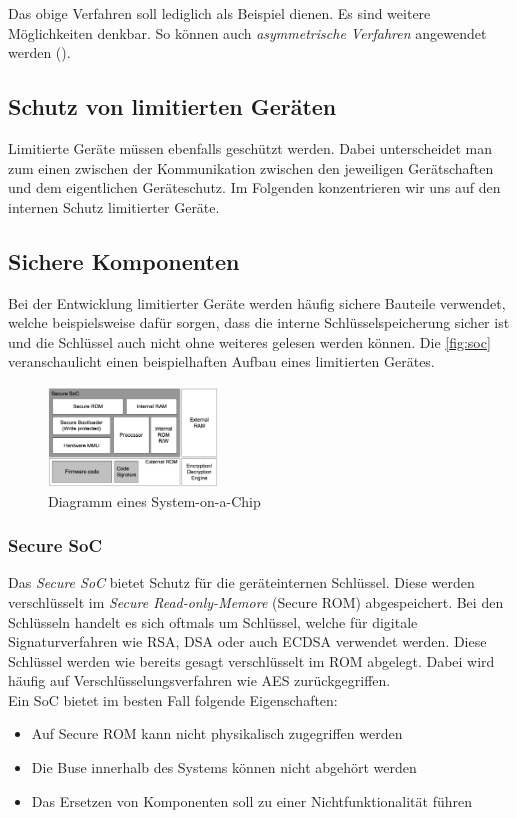 \documentclass[conference]{IEEEtran}
\begin{document}
Das obige Verfahren soll lediglich als Beispiel dienen. Es sind weitere Möglichkeiten denkbar. So können auch \textit{asymmetrische Verfahren} angewendet werden (\cite{pubenc}).

\subsection{Schutz von limitierten Geräten}

Limitierte Geräte müssen ebenfalls geschützt werden. Dabei unterscheidet man zum einen zwischen der Kommunikation zwischen den jeweiligen Gerätschaften und dem eigentlichen Geräteschutz. Im Folgenden konzentrieren wir uns auf den internen Schutz limitierter Geräte.

\subsection{Sichere Komponenten}

Bei der Entwicklung limitierter Geräte werden häufig sichere Bauteile verwendet, welche beispielsweise dafür sorgen, dass die interne Schlüsselspeicherung sicher ist und die Schlüssel auch nicht ohne weiteres gelesen werden können.
Die \autoref{fig:soc} veranschaulicht einen beispielhaften Aufbau eines limitierten Gerätes.

\begin{figure}[h]
\centering
  \includegraphics[width=0.4\textwidth]{soc}
  \caption{Diagramm eines System-on-a-Chip}
  \label{fig:soc}
\end{figure}

\subsubsection{Secure SoC} Das \textit{Secure SoC} bietet Schutz für die geräteinternen Schlüssel. Diese werden verschlüsselt im \textit{Secure Read-only-Memore} (Secure ROM) abgespeichert. Bei den Schlüsseln handelt es sich oftmals um Schlüssel, welche für digitale Signaturverfahren wie RSA, DSA oder auch ECDSA verwendet werden. Diese Schlüssel werden wie bereits gesagt verschlüsselt im ROM abgelegt. Dabei wird häufig auf Verschlüsselungsverfahren wie AES zurückgegriffen.\cite{anoopms}\\
Ein SoC bietet im besten Fall folgende Eigenschaften: 
\begin{itemize}
  \item Auf Secure ROM kann nicht physikalisch zugegriffen werden 
  \item Die Buse innerhalb des Systems können nicht abgehört werden
  \item Das Ersetzen von Komponenten soll zu einer Nichtfunktionalität führen 
\end{itemize} 
\end{document}
